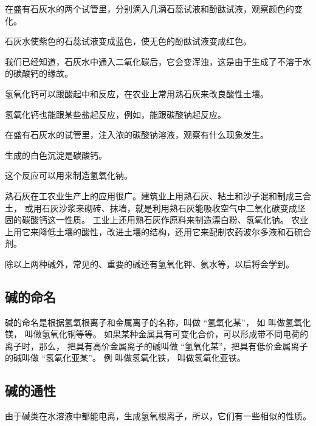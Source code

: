 \begin{shiyan}
    在盛有石灰水的两个试管里，分别滴入几滴石蕊试液和酚酞试液，观察颜色的变化。
\end{shiyan}

石灰水使紫色的石蕊试液变成蓝色，使无色的酚酞试液变成红色。

我们已经知道，石灰水中通入二氧化碳后，它会变浑浊，这是由于生成了不溶于水的碳酸钙的缘故。
\begin{fangchengshi}
\end{fangchengshi}

氢氧化钙可以跟酸起中和反应，在农业上常用熟石灰来改良酸性土壤。

氢氧化钙也能跟某些盐起反应，例如，能跟碳酸钠起反应。

\begin{shiyan}
    在盛有石灰水的试管里，注入浓的碳酸钠溶液，观察有什么现象发生。
\end{shiyan}

生成的白色沉淀是碳酸钙。
\begin{fangchengshi}
\end{fangchengshi}

这个反应可以用来制造氢氧化钠。

熟石灰在工农业生产上的应用很广。建筑业上用熟石灰、粘土和沙子混和制成三合土，
或用石灰沙浆来砌砖、抹墙，就是利用熟石灰能吸收空气中二氧化碳变成坚固的碳酸钙这一性质。
工业上还用熟石灰作原料来制造漂白粉、氢氧化钠。
农业上用它来降低土壤的酸性，改进土壤的结构，还用它来配制农药波尔多液和石硫合剂。

除以上两种碱外，常见的、重要的碱还有氢氧化钾、氨水等，以后将会学到。


\subsection{碱的命名}

碱的命名是根据氢氧根离子和金属离子的名称，叫做 “氢氧化\;某”，
如  叫做氢氧化镁，  叫做氢氧化铜等等。
如果某种金属具有可变化合价，可以形成带不同电荷的离子时，那么，
把具有高价金属离子的碱叫做 “氢氧化某”，把具有低价金属离子的碱叫做 “氢氧化亚某”。
例  叫做氢氧化铁，  叫做氢氧化亚铁。


\subsection{碱的通性}

由于碱类在水溶液中都能电离，生成氢氧根离子，所以，它们有一些相似的性质。

